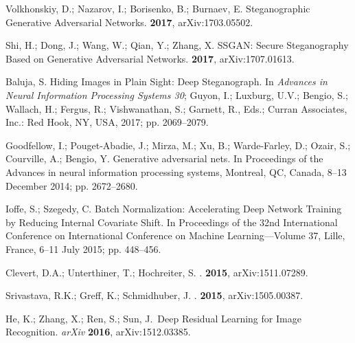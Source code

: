 \documentclass[futureinternet,article,accept,moreauthors,pdftex,10pt,a4paper]{Definitions/mdpi}
\begin{document}
\begin{thebibliography}{999}
Volkhonskiy, D.; Nazarov, I.; Borisenko, B.; Burnaev, E.
\newblock Steganographic Generative Adversarial Networks.
 {\bf 2017},
\newblock arXiv:1703.05502.

Shi, H.; Dong, J.; Wang, W.; Qian, Y.; Zhang, X.
\newblock SSGAN: Secure Steganography Based on Generative Adversarial Networks.
 {\bf 2017},
\newblock arXiv:1707.01613.

Baluja, S. Hiding Images in Plain Sight: Deep Steganograph.
\newblock In {\em Advances in Neural Information Processing Systems 30}; Guyon,
  I.; Luxburg, U.V.; Bengio, S.; Wallach, H.; Fergus, R.; Vishwanathan, S.;
  Garnett, R., Eds.; Curran Associates, Inc.: Red Hook, NY, USA,  2017; pp. 2069--2079.


Goodfellow, I.; Pouget-Abadie, J.; Mirza, M.; Xu, B.; Warde-Farley, D.; Ozair,
  S.; Courville, A.; Bengio, Y.
\newblock Generative adversarial nets.
\newblock In {Proceedings of the } Advances in neural information processing systems, Montreal, QC, Canada,  8--13 December 2014; pp. 2672--2680.


Ioffe, S.; Szegedy, C.
\newblock Batch Normalization: Accelerating Deep Network Training by Reducing
  Internal Covariate Shift.
\newblock  In Proceedings of the 32nd International Conference on International  Conference on Machine Learning---Volume 37, Lille, France, 6--11 July 2015;  pp.  448--456.


Clevert, D.A.; Unterthiner, T.; Hochreiter, S.
.
 {\bf 2015},
\newblock arXiv:1511.07289.

Srivastava, R.K.; Greff, K.; Schmidhuber, J.
.
 {\bf 2015},
\newblock arXiv:1505.00387.

He, K.; Zhang, X.; Ren, S.; Sun, J.~{Deep Residual Learning for Image Recognition}. \emph{arXiv}  \textbf{2016}, arXiv:1512.03385.



\end{thebibliography}
\end{document}
